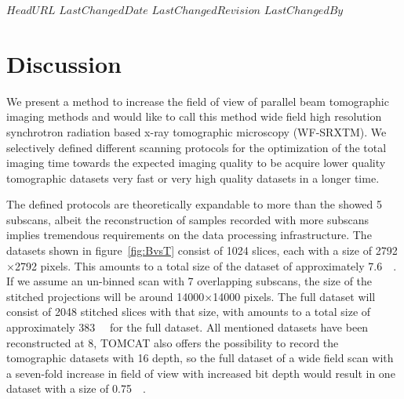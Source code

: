 \svnidlong
{$HeadURL$}
{$LastChangedDate$}
{$LastChangedRevision$}
{$LastChangedBy$}

\ifhtml
\else
\begin{center}
\end{center}
\fi

\section{Discussion}

We present a method to increase the field of view of parallel beam tomographic imaging methods and would like to call this method wide field high resolution synchrotron radiation based x-ray tomographic microscopy (WF-SRXTM). We selectively defined different scanning protocols for the optimization of the total imaging time towards the expected imaging quality to be acquire lower quality tomographic datasets very fast or very high quality datasets in a longer time.

The defined protocols are theoretically expandable to more than the showed 5 subscans, albeit the reconstruction of samples recorded with more subscans implies tremendous requirements on the data processing infrastructure. The datasets shown in figure~\ref{fig:BvsT} consist of 1024 slices, each with a size of 2792$\times$2792 pixels. This amounts to a total size of the dataset of approximately \SI{7.6}{\giga\byte}. If we assume an un-binned scan with 7 overlapping subscans, the size of the stitched projections will be around 14000$\times$14000 pixels. The full dataset will consist of 2048 stitched slices with that size, with amounts to a total size of approximately \SI{383}{\giga\byte} for the full dataset. All mentioned datasets have been reconstructed at \SI{8}{\bit}, TOMCAT also offers the possibility to record the tomographic datasets with \SI{16}{\bit} depth, so the full dataset of a wide field scan with a seven-fold increase in field of view with increased bit depth would result in one dataset with a size of \SI{0.75}{\tera\byte}.


